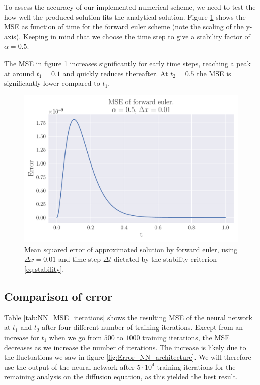 \documentclass[12pt]{extarticle}
\begin{document}
To assess the accuracy of our implemented numerical scheme, we need to test the how well the produced solution fits the analytical solution. Figure \ref{fig:FE_MSE} shows the MSE as function of time for the forward euler scheme (note the scaling of the y-axis). Keeping in mind that we choose the time step to give a stability factor of $\alpha=0.5$. 

The MSE in figure \ref{fig:FE_MSE} increases significantly for early time steps, reaching a peak at around $t_1=0.1$ and quickly reduces thereafter. At $t_2=0.5$ the MSE is significantly lower compared to $t_1$.  

\begin{figure}[h]
	\centering
	\includegraphics[scale=0.5]{../output/plots/MSE_FE_dx_001.pdf}
	\caption{Mean squared error of approximated solution by forward euler, using $\Delta x=0.01$ and time step $\Delta t$ dictated by the stability criterion \eqref{eq:stability}.}
	\label{fig:FE_MSE}
\end{figure}


\subsection{Comparison of error}
Table \ref{tab:NN_MSE_iterations} shows the resulting MSE of the neural network at $t_1$ and $t_2$ after four different number of training iterations. Except from an increase for $t_1$ when we go from $500$ to $1000$ training iterations, the MSE decreases as we increase the number of iterations. The increase is likely due to the fluctuations we saw in figure \ref{fig:Error_NN_architecture}. We will therefore use the output of the neural network after $5\cdot10^4$ training iterations for the remaining analysis on the diffusion equation, as this yielded the best result. 
\end{document}
